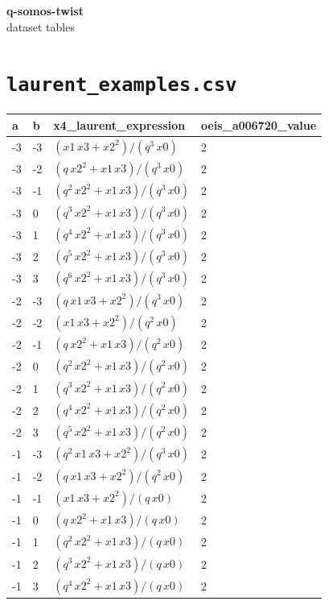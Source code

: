 \documentclass[10pt]{article}
\begin{document}
\begin{center}\Large\textbf{q-somos-twist} \\ \normalsize dataset tables\end{center}
\vspace{1em}
\section*{\texttt{laurent\_examples.csv}}
{\footnotesize
\begin{longtable}{@{}llll@{}}
\toprule
\textbf{a} & \textbf{b} & \textbf{x4\_laurent\_expression} & \textbf{oeis\_a006720\_value} \\
\midrule\endhead
-3 & -3 & $(x1\,x3 + x2^{2})/(q^{3}\,x0)$ & 2 \\
-3 & -2 & $(q\,x2^{2} + x1\,x3)/(q^{3}\,x0)$ & 2 \\
-3 & -1 & $(q^{2}\,x2^{2} + x1\,x3)/(q^{3}\,x0)$ & 2 \\
-3 & 0 & $(q^{3}\,x2^{2} + x1\,x3)/(q^{3}\,x0)$ & 2 \\
-3 & 1 & $(q^{4}\,x2^{2} + x1\,x3)/(q^{3}\,x0)$ & 2 \\
-3 & 2 & $(q^{5}\,x2^{2} + x1\,x3)/(q^{3}\,x0)$ & 2 \\
-3 & 3 & $(q^{6}\,x2^{2} + x1\,x3)/(q^{3}\,x0)$ & 2 \\
-2 & -3 & $(q\,x1\,x3 + x2^{2})/(q^{3}\,x0)$ & 2 \\
-2 & -2 & $(x1\,x3 + x2^{2})/(q^{2}\,x0)$ & 2 \\
-2 & -1 & $(q\,x2^{2} + x1\,x3)/(q^{2}\,x0)$ & 2 \\
-2 & 0 & $(q^{2}\,x2^{2} + x1\,x3)/(q^{2}\,x0)$ & 2 \\
-2 & 1 & $(q^{3}\,x2^{2} + x1\,x3)/(q^{2}\,x0)$ & 2 \\
-2 & 2 & $(q^{4}\,x2^{2} + x1\,x3)/(q^{2}\,x0)$ & 2 \\
-2 & 3 & $(q^{5}\,x2^{2} + x1\,x3)/(q^{2}\,x0)$ & 2 \\
-1 & -3 & $(q^{2}\,x1\,x3 + x2^{2})/(q^{3}\,x0)$ & 2 \\
-1 & -2 & $(q\,x1\,x3 + x2^{2})/(q^{2}\,x0)$ & 2 \\
-1 & -1 & $(x1\,x3 + x2^{2})/(q\,x0)$ & 2 \\
-1 & 0 & $(q\,x2^{2} + x1\,x3)/(q\,x0)$ & 2 \\
-1 & 1 & $(q^{2}\,x2^{2} + x1\,x3)/(q\,x0)$ & 2 \\
-1 & 2 & $(q^{3}\,x2^{2} + x1\,x3)/(q\,x0)$ & 2 \\
-1 & 3 & $(q^{4}\,x2^{2} + x1\,x3)/(q\,x0)$ & 2 \\

\end{longtable}}
\end{document}
